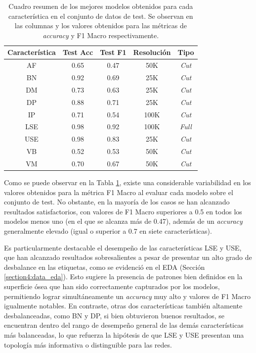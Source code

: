 \begin{table}[h]
    \centering
    \begin{tabular}{|c|c|c|c|c|}
    \hline
    \rowcolor[HTML]{D33333} 
    {\color[HTML]{FFFFFF} \textbf{Característica}} & {\color[HTML]{FFFFFF} \textbf{Test Acc}} & {\color[HTML]{FFFFFF} \textbf{Test F1}} & {\color[HTML]{FFFFFF} \textbf{Resolución}} & {\color[HTML]{FFFFFF} \textbf{Tipo}} \\ \hline
    AF & 0.65 & 0.47 & 50K & \textit{Cut} \\
    BN & 0.92 & 0.69 & 25K & \textit{Cut} \\
    DM & 0.73 & 0.63 & 25K & \textit{Cut} \\
    DP & 0.88 & 0.71 & 25K & \textit{Cut} \\
    IP & 0.71 & 0.54 & 100K & \textit{Cut} \\
    LSE & 0.98 & 0.92 & 100K & \textit{Full} \\
    USE & 0.98 & 0.83 & 25K & \textit{Cut} \\
    VB & 0.52 & 0.53 & 50K & \textit{Cut} \\
    VM & 0.70 & 0.67 & 50K & \textit{Cut} \\ \hline
    \end{tabular}
    \caption[Cuadro resumen de los mejores modelos obtenidos para cada característica]{Cuadro resumen de los mejores modelos obtenidos para cada característica en el conjunto de datos de test. Se observan en las columnas  y  los valores obtenidos para las métricas de \textit{accuracy} y F1 Macro respectivamente.}
    \label{table5:single_tag__results}
\end{table}

Como se puede observar en la Tabla \ref{table5:single_tag__results}, existe una considerable variabilidad en los valores obtenidos para la métrica F1 Macro al evaluar cada modelo sobre el conjunto de test. No obstante, en la mayoría de los casos se han alcanzado resultados satisfactorios, con valores de F1 Macro superiores a 0.5 en todos los modelos menos uno (en el que se alcanza más de 0.47), además de un \textit{accuracy} generalmente elevado (igual o superior a 0.7 en siete características).

Es particularmente destacable el desempeño de las características LSE y USE, que han alcanzado resultados sobresalientes a pesar de presentar un alto grado de desbalance en las etiquetas, como se evidenció en el EDA (Sección \ref{section4:data_eda}). Esto sugiere la presencia de patrones bien definidos en la superficie ósea que han sido correctamente capturados por los modelos, permitiendo lograr simultáneamente un \textit{accuracy} muy alto y valores de F1 Macro igualmente notables. En contraste, otras dos características también altamente desbalanceadas, como BN y DP, si bien obtuvieron buenos resultados, se encuentran dentro del rango de desempeño general de las demás características más balanceadas, lo que refuerza la hipótesis de que LSE y USE presentan una topología más informativa o distinguible para las redes.

